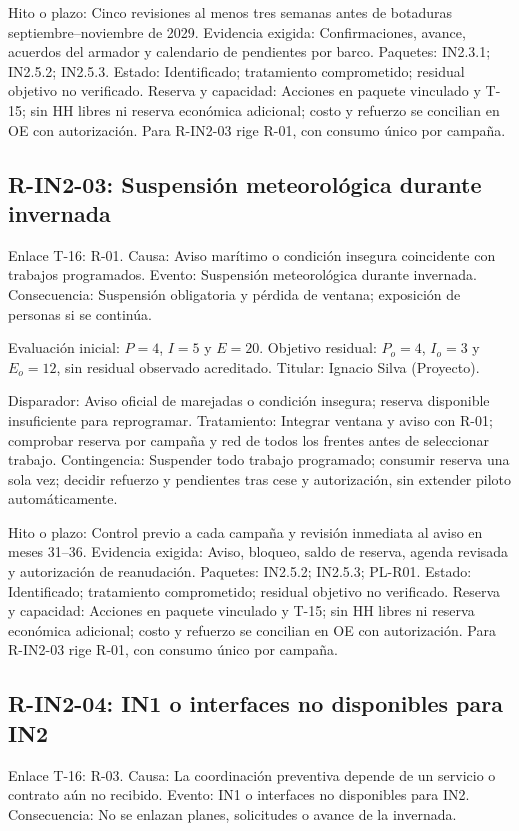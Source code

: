 Hito o plazo: Cinco revisiones al menos tres semanas antes de botaduras septiembre--noviembre de 2029. Evidencia exigida: Confirmaciones, avance, acuerdos del armador y calendario de pendientes por barco. Paquetes: IN2.3.1; IN2.5.2; IN2.5.3. Estado: Identificado; tratamiento comprometido; residual objetivo no verificado. Reserva y capacidad: Acciones en paquete vinculado y T-15; sin HH libres ni reserva económica adicional; costo y refuerzo se concilian en OE con autorización. Para R-IN2-03 rige R-01, con consumo único por campaña.

\subsection{R-IN2-03: Suspensión meteorológica durante invernada}
Enlace T-16: R-01. Causa: Aviso marítimo o condición insegura coincidente con trabajos programados. Evento: Suspensión meteorológica durante invernada. Consecuencia: Suspensión obligatoria y pérdida de ventana; exposición de personas si se continúa.

Evaluación inicial: $P=4$, $I=5$ y $E=20$. Objetivo residual: $P_o=4$, $I_o=3$ y $E_o=12$, sin residual observado acreditado. Titular: Ignacio Silva (Proyecto).

Disparador: Aviso oficial de marejadas o condición insegura; reserva disponible insuficiente para reprogramar. Tratamiento: Integrar ventana y aviso con R-01; comprobar reserva por campaña y red de todos los frentes antes de seleccionar trabajo. Contingencia: Suspender todo trabajo programado; consumir reserva una sola vez; decidir refuerzo y pendientes tras cese y autorización, sin extender piloto automáticamente.

Hito o plazo: Control previo a cada campaña y revisión inmediata al aviso en meses 31--36. Evidencia exigida: Aviso, bloqueo, saldo de reserva, agenda revisada y autorización de reanudación. Paquetes: IN2.5.2; IN2.5.3; PL-R01. Estado: Identificado; tratamiento comprometido; residual objetivo no verificado. Reserva y capacidad: Acciones en paquete vinculado y T-15; sin HH libres ni reserva económica adicional; costo y refuerzo se concilian en OE con autorización. Para R-IN2-03 rige R-01, con consumo único por campaña.

\subsection{R-IN2-04: IN1 o interfaces no disponibles para IN2}
Enlace T-16: R-03. Causa: La coordinación preventiva depende de un servicio o contrato aún no recibido. Evento: IN1 o interfaces no disponibles para IN2. Consecuencia: No se enlazan planes, solicitudes o avance de la invernada.

